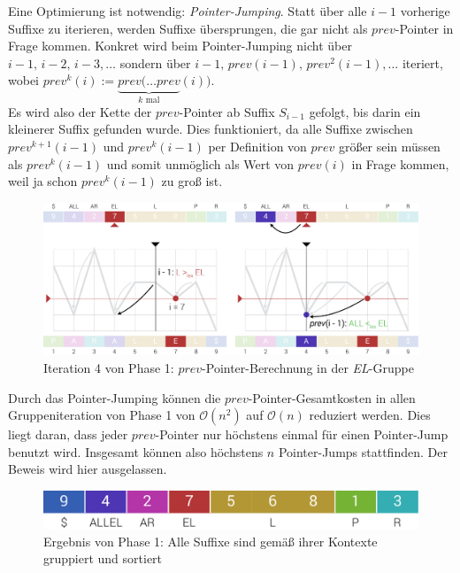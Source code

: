 \documentclass[twoside,11pt]{article}
\theoremstyle{break}
\begin{document}
Eine Optimierung ist notwendig: \textit{Pointer-Jumping}. Statt über alle $i - 1$ vorherige Suffixe zu iterieren, werden Suffixe übersprungen, die gar nicht als $prev$-Pointer in Frage kommen. Konkret wird beim Pointer-Jumping nicht über $i - 1,\, i - 2,\, i - 3, \dots$ sondern über $i - 1,\, prev(i - 1),\, prev^2(i - 1), \dots$ iteriert, wobei $prev^k(i) := \underbrace{prev(\dots prev}_{k \text{ mal}}(i))$.\\

Es wird also der Kette der $prev$-Pointer ab Suffix $S_{i - 1}$ gefolgt, bis darin ein kleinerer Suffix gefunden wurde. Dies funktioniert, da alle Suffixe zwischen $prev^{k + 1}(i - 1)$ und $prev^k(i - 1)$ per Definition von $prev$ größer sein müssen als $prev^k(i - 1)$ und somit unmöglich als Wert von $prev(i)$ in Frage kommen, weil ja schon $prev^k(i - 1)$ zu groß ist.

\begin{figure}[h]
	\centering
	\includegraphics[width=\linewidth,bb=0 0 1310 534]{./assets/phase1-EL.pdf}
	\caption{Iteration 4 von Phase 1: $prev$-Pointer-Berechnung in der \textit{EL}-Gruppe}
\label{fig:phase1-EL}
\end{figure}

Durch das Pointer-Jumping können die $prev$-Pointer-Gesamtkosten in allen Gruppeniteration von Phase 1 von $\mathcal{O}(n^2)$ auf $\mathcal{O}(n)$ reduziert werden. Dies liegt daran, dass jeder $prev$-Pointer nur höchstens einmal für einen Pointer-Jump benutzt wird. Insgesamt können also höchstens $n$ Pointer-Jumps stattfinden. Der Beweis wird hier ausgelassen.

\begin{figure}[h]
	\centering
	\includegraphics[width=0.5\linewidth,bb=0 0 640 67]{./assets/phase1Result.pdf}
	\caption{Ergebnis von Phase 1: Alle Suffixe sind gemäß ihrer Kontexte gruppiert und sortiert}
\label{fig:phase1Result}
\end{figure}
\end{document}
